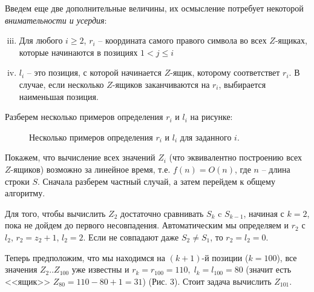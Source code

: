 \documentclass[letterpaper, 11pt]{article}
\begin{document}
\par
Введем еще две дополнительные величины, их осмысление потребует некоторой \textit{внимательности и усердия}:
\begin{enumerate}[(i)]
\setcounter{enumi}{2}
\item
Для любого $i \geq 2$, $r_i$ -- координата самого правого символа во всех $Z$-ящиках, которые начинаются в позициях $1 < j \leq i$
\item
$l_i$ -- это позиция, с которой начинается $Z$-ящик, которому соответствет $r_i$. В случае, если несколько $Z$-ящиков заканчиваются на $r_i$, выбирается наименьшая позиция.
\end{enumerate}
\par
Разберем несколько примеров определения $r_i$ и $l_i$ на рисунке:
\begin{figure}[H]
  \caption{Несколько примеров определения $r_i$ и $l_i$ для заданного $i$.}
\end{figure}
\par
Покажем, что вычисление всех значений $Z_i$ (что эквивалентно построению всех $Z$-ящиков) возможно за линейное время, т.е. $f(n) = O(n)$, где $n$ -- длина строки $S$. Сначала разберем частный случай, а затем перейдем к общему алгоритму.
\par
Для того, чтобы вычислить $Z_2$ достаточно сравнивать $S_k$ c $S_{k-1}$, начиная с $k = 2$, пока не дойдем до первого несовпадения. Автоматическим мы определяем и $r_2$ с $l_2$, $r_2 = z_2 + 1$, $l_2 = 2$. Если не совпадают даже $S_2 \neq S_1$, то $r_2 = l_2 = 0$.
\par
Теперь предположим, что мы находимся на $(k + 1)$-й позиции ($k = 100$), все значения $Z_2 .. Z_{100}$ уже известны и $r_k = r_{100} = 110, \; l_k = l_{100} = 80$ (значит есть <<ящик>> $Z_{80} = 110 - 80 + 1 = 31$) (Рис. 3). Стоит задача вычислить $Z_{101}$.
\end{document}
